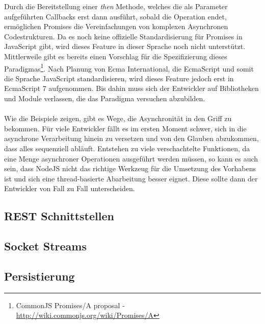 Durch die Bereitstellung einer \textit{then} Methode, welches die als Parameter aufgeführten Callbacks erst dann ausführt, sobald die Operation endet, ermöglichen Promises die Vereinfachungen von komplexen Asynchronen Codestrukturen. Da es noch keine offizielle Standardisierung für Promises in JavaScript gibt, wird dieses Feature in dieser Sprache noch nicht unterstützt. Mittlerweile gibt es bereits einen Vorschlag für die Spezifizierung dieses Paradigmas\footnote{CommonJS Promises/A proposal - \url{http://wiki.commonjs.org/wiki/Promises/A}}. Nach Planung von Ecma International, die EcmaScript und somit die Sprache JavaScript standardisieren, wird dieses Feature jedoch erst in EcmaScript 7 aufgenommen. Bis dahin muss sich der Entwickler auf Bibliotheken und Module verlassen, die das Paradigma versuchen abzubilden.\\
\\
Wie die Beispiele zeigen, gibt es Wege, die Asynchronität in den Griff zu bekommen. Für viele Entwickler fällt es im ersten Moment schwer, sich in die asynchrone Verarbeitung hinein zu versetzen und von den Glauben abzukommen, dass alles sequenziell abläuft. Entstehen zu viele verschachtelte Funktionen, da eine Menge asynchroner Operationen ausgeführt werden müssen, so kann es auch sein, dass NodeJS nicht das richtige Werkzeug für die Umsetzung des Vorhabens ist und sich eine thread-basierte Abarbeitung besser eignet. Diese sollte dann der Entwickler von Fall zu Fall unterscheiden.

\subsection{REST Schnittstellen}

\subsection{Socket Streams}

\subsection{Persistierung}
